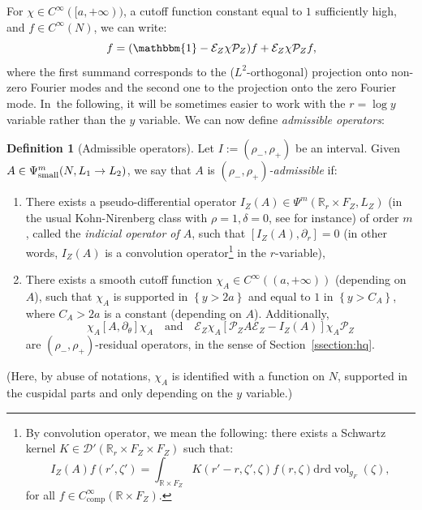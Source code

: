 \documentclass[10pt]{amsart}
\newcommand{\quand}{\quad\text{and}\quad}
\newcommand{\R}{\mathbb{R}}
\newcommand{\mc}{\mathcal}
\newcommand{\E}{\mathcal{E}}
\newcommand{\dd}{\mathrm{d}}
\DeclareMathOperator{\vol}{\mathrm{vol}}
\theoremstyle{plain}
\theoremstyle{definition}
\newtheorem{definition}{Definition}[section]
\begin{document}
For $\chi \in C^\infty([a,+\infty))$, a cutoff function constant equal to $1$ sufficiently high, and $f \in C^\infty(N)$, we can write:
\[
f = (\mathbbm{1}-\E_Z \chi \mc{P}_Z)f + \E_Z \chi \mc{P}_Z f,
\]
where the first summand corresponds to the ($L^2$-orthogonal) projection onto non-zero Fourier modes and the second one to the projection onto the zero Fourier mode. In~the following, it will be sometimes easier to work with the $r=\log y$ variable rather than the $y$ variable. We can now define \emph{admissible operators}:

\begin{definition}[Admissible operators]
\label{definition:rho-admissible}
Let $I := (\rho_-,\rho_+)$ be an interval. Given $A\in \Psi^m_{\textup{small}}(N,L_1 \to L_2)$, we say that $A$ is \emph{$(\rho_-,\rho_+)$-admissible} if:
\begin{enumerate}
\item There exists a pseudo-differential operator $I_Z(A) \in \Psi^m(\R_r \times F_Z, L_Z)$ (in the usual Kohn-Nirenberg class with $\rho=1,\delta=0$, see \cite[Def.\,1.1]{Shubin-01} for instance) of order $m$, called the \emph{indicial operator of $A$}, such that $[I_Z(A),\partial_r] = 0$ (in other words, $I_Z(A)$ is a convolution operator\footnote{By convolution operator, we mean the following: there exists a Schwartz kernel $K \in \mc{D}'(\R_r \times F_Z \times F_Z)$ such that:\vspace*{-3pt}
\[
I_Z(A)f (r',\zeta') = \int_{\R \times F_Z} K(r'-r,\zeta',\zeta) f(r,\zeta) \dd r \dd \vol_{g_F}(\zeta),
\]
for all $f \in C^\infty_{\mathrm{comp}}(\R \times F_Z)$.}
in the $r$-variable),
\item There exists a smooth cutoff function $\chi_A \in C^\infty((a,+\infty))$ (depending on $A$), such that $\chi_A$ is supported in $\left\{y>2a\right\}$ and equal to $1$ in $\left\{y> C_A\right\}$, where $C_A > 2a$ is a constant (depending on $A$). {\color{black}Additionally,}
\begin{equation}
\label{eq:preserving-theta-modes}
\chi_A [A,\partial_\theta] \chi_A \quand \mathcal{E}_Z\chi_A \left[\mathcal{P}_Z A \mathcal{E}_Z - I_Z(A) \right] \chi_A \mathcal{P}_Z
\end{equation}
are $(\rho_-,\rho_+)$-residual operators, in the sense of Section~\ref{ssection:hq}.
\end{enumerate}
(Here, by abuse of notations, $\chi_A$ is identified with a function on $N$, supported in the cuspidal parts and only depending on the $y$ variable.)
\end{definition}
\end{document}
